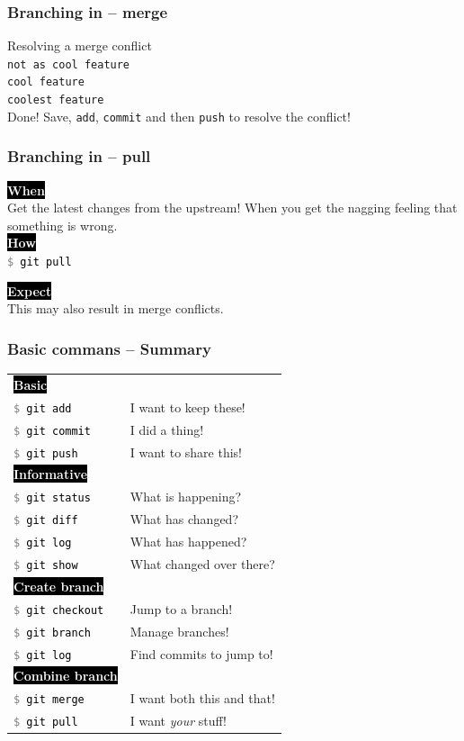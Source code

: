 \documentclass{beamer}
\newcommand{\keyword}[1]{\hspace{-1.0em}\colorbox{black}{\textcolor{white}{\textbf{#1}\vphantom{Ep}}}\vspace{0.2em}} %
\newcommand{\command}[1]{\colorbox{black!90!white!10!}{\vphantom{Ep}\texttt{\textcolor{gray}{\$} \textcolor{black}{#1}}}}
\begin{document}
\begin{frame}
  \frametitle{Branching in -- merge} %

    Resolving a merge conflict \\[1em]

        \texttt{not as cool feature} \\
        \texttt{cool feature} \\
        \texttt{coolest feature} \\[1em]
        Done! Save, \texttt{add}, \texttt{commit} and then \texttt{push} to
        resolve the conflict!
\end{frame}

\begin{frame}
  \frametitle{Branching in -- pull}
    \keyword{When}\\
    Get the latest changes from the upstream! When you get the nagging feeling
    that something is wrong. \\[1em]

    \keyword{How}\\
    \command{git pull} \\[3em]

    \pause

    \keyword{Expect}\\
    This may also result in \alert{merge conflicts}. \\[1em]
\end{frame}

\begin{frame}[fragile]
  \frametitle{Basic commans -- Summary}
  \begin{tabular}{ll}
    \keyword{Basic} & \\
    \command{git add} & I want to keep these! \\
    \command{git commit} & I did a thing! \\
    \command{git push} & I want to share this! \\ %

    \keyword{Informative} & \\
    \command{git status} & What is happening? \\
    \command{git diff} & What has changed? \\
    \command{git log} & What has happened? \\
    \command{git show} & What changed over there? \\

    \keyword{Create branch} & \\
    \command{git checkout} & Jump to a branch! \\
    \command{git branch} & Manage branches! \\
    \command{git log} & Find commits to jump to! \\

    \keyword{Combine branch} & \\
    \command{git merge} & I want both this and that! \\
    \command{git pull} & I want \emph{your} stuff! \\
  \end{tabular}
\end{frame}
\end{document}

